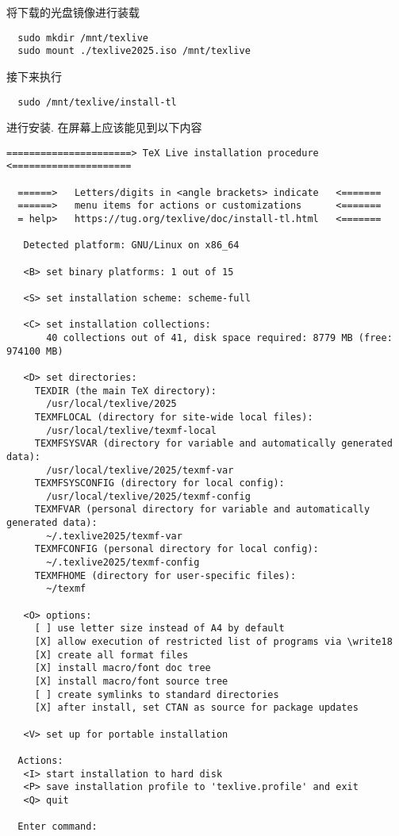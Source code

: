 将下载的光盘镜像进行装载
\begin{lstlisting}
  sudo mkdir /mnt/texlive
  sudo mount ./texlive2025.iso /mnt/texlive
\end{lstlisting}
接下来执行
\begin{lstlisting}
  sudo /mnt/texlive/install-tl
\end{lstlisting}
进行安装.
在屏幕上应该能见到以下内容
\begin{lstlisting}[language = {}, deleteemph = set]
  ======================> TeX Live installation procedure <=====================

  ======>   Letters/digits in <angle brackets> indicate   <=======
  ======>   menu items for actions or customizations      <=======
  = help>   https://tug.org/texlive/doc/install-tl.html   <=======

   Detected platform: GNU/Linux on x86_64

   <B> set binary platforms: 1 out of 15

   <S> set installation scheme: scheme-full

   <C> set installation collections:
       40 collections out of 41, disk space required: 8779 MB (free: 974100 MB)

   <D> set directories:
     TEXDIR (the main TeX directory):
       /usr/local/texlive/2025
     TEXMFLOCAL (directory for site-wide local files):
       /usr/local/texlive/texmf-local
     TEXMFSYSVAR (directory for variable and automatically generated data):
       /usr/local/texlive/2025/texmf-var
     TEXMFSYSCONFIG (directory for local config):
       /usr/local/texlive/2025/texmf-config
     TEXMFVAR (personal directory for variable and automatically generated data):
       ~/.texlive2025/texmf-var
     TEXMFCONFIG (personal directory for local config):
       ~/.texlive2025/texmf-config
     TEXMFHOME (directory for user-specific files):
       ~/texmf

   <O> options:
     [ ] use letter size instead of A4 by default
     [X] allow execution of restricted list of programs via \write18
     [X] create all format files
     [X] install macro/font doc tree
     [X] install macro/font source tree
     [ ] create symlinks to standard directories
     [X] after install, set CTAN as source for package updates

   <V> set up for portable installation

  Actions:
   <I> start installation to hard disk
   <P> save installation profile to 'texlive.profile' and exit
   <Q> quit

  Enter command:
\end{lstlisting}
